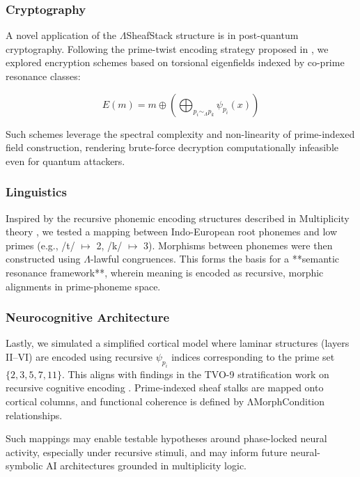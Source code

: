 \documentclass{article}
\theoremstyle{plain}
\begin{document}
\subsubsection*{Cryptography}

A novel application of the $\Lambda$SheafStack structure is in post-quantum cryptography. Following the prime-twist encoding strategy proposed in \cite{vanosdol2025primecrypto}, we explored encryption schemes based on torsional eigenfields indexed by co-prime resonance classes:

\begin{equation}
E(m) = m \oplus \left(\bigoplus_{p_i \sim_\Lambda p_k} \psi_{p_i}(x)\right)
\end{equation}

Such schemes leverage the spectral complexity and non-linearity of prime-indexed field construction, rendering brute-force decryption computationally infeasible even for quantum attackers.

\subsubsection*{Linguistics}

Inspired by the recursive phonemic encoding structures described in Multiplicity theory \cite{vanGelder2025Multiplicity}, we tested a mapping between Indo-European root phonemes and low primes (e.g., /t/ $\mapsto$ 2, /k/ $\mapsto$ 3). Morphisms between phonemes were then constructed using $\Lambda$-lawful congruences. This forms the basis for a **semantic resonance framework**, wherein meaning is encoded as recursive, morphic alignments in prime-phoneme space.

\subsubsection*{Neurocognitive Architecture}

Lastly, we simulated a simplified cortical model where laminar structures (layers II–VI) are encoded using recursive $\psi_{p_i}$ indices corresponding to the prime set $\{2, 3, 5, 7, 11\}$. This aligns with findings in the TVO-9 stratification work on recursive cognitive encoding \cite{vanosdol2025tensors}. Prime-indexed sheaf stalks are mapped onto cortical columns, and functional coherence is defined by ΛMorphCondition relationships.

Such mappings may enable testable hypotheses around phase-locked neural activity, especially under recursive stimuli, and may inform future neural-symbolic AI architectures grounded in multiplicity logic.
\end{document}
